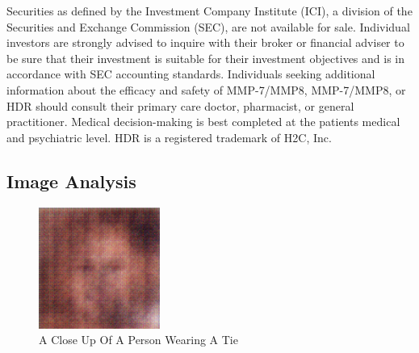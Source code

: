 \documentclass{article}%
\begin{document}
Securities as defined by the Investment Company Institute (ICI), a division of the Securities and Exchange Commission (SEC), are not available for sale. Individual investors are strongly advised to inquire with their broker or financial adviser to be sure that their investment is suitable for their investment objectives and is in accordance with SEC accounting standards.\newline%
Individuals seeking additional information about the efficacy and safety of MMP{-}7/MMP8, MMP{-}7/MMP8, or HDR should consult their primary care doctor, pharmacist, or general practitioner. Medical decision{-}making is best completed at the patients medical and psychiatric level.\newline%
HDR is a registered trademark of H2C, Inc.

%
\subsection{Image Analysis}%
\label{subsec:ImageAnalysis}%


\begin{figure}[h!]%
\centering%
\includegraphics[width=150px]{500_fake_images/samples_5_464.png}%
\caption{A Close Up Of A Person Wearing A Tie}%
\end{figure}

%
\end{document}

